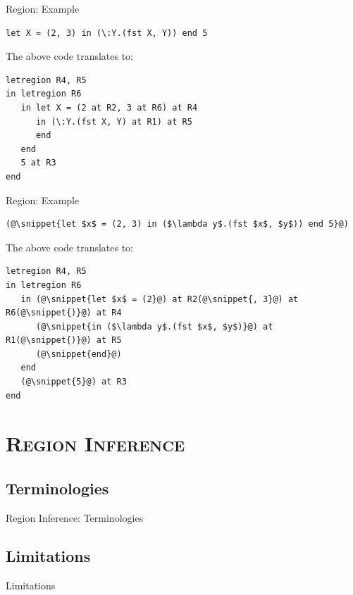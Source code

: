 \documentclass[xcolor=x11names,compress]{beamer}
\newcommand{\snippet}[1] {\textcolor{code}{\texttt{#1}}}
\renewcommand{\(}{\begin{columns}}
\renewcommand{\)}{\end{columns}}
\newcommand{\<}[1]{\begin{column}{#1}}
\renewcommand{\>}{\end{column}}
\begin{document}
\begin{frame}[fragile]{Region: Example}
\begin{lstlisting}
let X = (2, 3) in (\:Y.(fst X, Y)) end 5
\end{lstlisting}

The above code translates to:

\begin{lstlisting}
letregion R4, R5
in letregion R6
   in let X = (2 at R2, 3 at R6) at R4
      in (\:Y.(fst X, Y) at R1) at R5
      end
   end
   5 at R3
end
\end{lstlisting}
\end{frame}

\begin{frame}[fragile]{Region: Example}
\begin{lstlisting}
(@\snippet{let $x$ = (2, 3) in ($\lambda y$.(fst $x$, $y$)) end 5}@)
\end{lstlisting}

The above code translates to:

\begin{lstlisting}
letregion R4, R5
in letregion R6
   in (@\snippet{let $x$ = (2}@) at R2(@\snippet{, 3}@) at R6(@\snippet{)}@) at R4
      (@\snippet{in ($\lambda y$.(fst $x$, $y$)}@) at R1(@\snippet{)}@) at R5
      (@\snippet{end}@)
   end
   (@\snippet{5}@) at R3
end
\end{lstlisting}
\end{frame}

\section{\scshape Region Inference}
\subsection{Terminologies}
\begin{frame}{Region Inference: Terminologies}
    
\end{frame}

\subsection{Limitations}
\begin{frame}{Limitations}
    
\end{frame}
\end{document}
